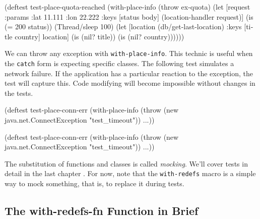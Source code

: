 \else

\begin{english}
  \begin{clojure}
(deftest test-place-quota-reached
  (with-place-info (throw ex-quota)
    (let [request {:params {:lat 11.111 :lon 22.222}}
          {:keys [status body]} (location-handler request)]
      (is (= 200 status))
      (Thread/sleep 100)
      (let [location (db/get-last-location)
            {:keys [title country]} location]
        (is (nil? title))
        (is (nil? country))))))
  \end{clojure}
\end{english}

\fi

We can throw any exception with \verb|with-place-info|. This technic is useful when the \verb|catch| form is expecting specific classes.
The following test simulates a network failure.
If the application has a particular reaction to the exception, the test will capture this.
Code modifying will become impossible without changes in the tests.


\ifx\DEVICETYPE\MOBILE

\begin{english}
  \begin{clojure}
(deftest test-place-conn-err
  (with-place-info
    (throw (new java.net.ConnectException
             "test_timeout"))
    ...))
  \end{clojure}
\end{english}

\else

\begin{english}
  \begin{clojure}
(deftest test-place-conn-err
  (with-place-info
    (throw (new java.net.ConnectException "test_timeout"))
    ...))
  \end{clojure}
\end{english}

\fi


The substitution of functions and classes is called \emph{mocking}.
We'll cover tests in detail in the last chapter .
For now, note that the \verb|with-redefs| macro is a simple way to mock something, that is, to replace it during tests.

\subsection{The with-redefs-fn Function in Brief}

